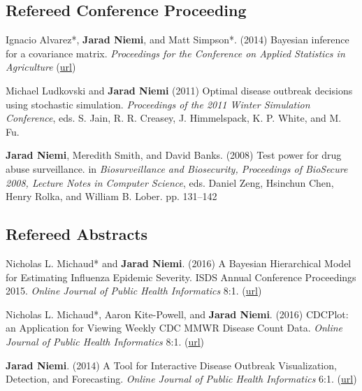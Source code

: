 \documentclass[overlapped,line]{res}
\newcommand{\sinceappt}{}
\begin{document}
\begin{resume}
\sinceappt

\subsection{\bf Refereed Conference Proceeding} \vspace{-0.2in}

Ignacio Alvarez*, {\bf Jarad Niemi}, and Matt Simpson*. (2014) Bayesian inference for a covariance matrix. \emph{Proceedings for the Conference on Applied Statistics in Agriculture} (\href{http://newprairiepress.org/agstatconference/2014/proceedings/8/}{url})

Michael Ludkovski and {\bf Jarad Niemi} (2011) Optimal disease outbreak decisions using stochastic simulation. \emph{Proceedings of the 2011 Winter Simulation Conference}, eds. S. Jain, R. R. Creasey, J. Himmelspack, K. P. White, and M. Fu.

\sinceappt

{\bf Jarad Niemi}, Meredith Smith, and David Banks. (2008) Test power for drug abuse surveillance. in \emph{Biosurveillance and Biosecurity, Proceedings of BioSecure 2008, Lecture Notes in Computer Science},  eds. Daniel Zeng, Hsinchun Chen, Henry Rolka, and William B. Lober. pp. 131--142



\subsection{\bf Refereed Abstracts} \vspace{-0.2in}

Nicholas L. Michaud* and {\bf Jarad Niemi}. (2016) A Bayesian Hierarchical Model for Estimating Influenza Epidemic Severity. ISDS Annual Conference Proceedings 2015. \emph{Online Journal of Public Health Informatics} 8:1. (\href{http://ojphi.org/ojs/index.php/ojphi/article/view/6438}{url})

Nicholas L. Michaud*, Aaron Kite-Powell, and {\bf Jarad Niemi}. (2016) CDCPlot: an Application for Viewing Weekly CDC MMWR Disease Count Data. \emph{Online Journal of Public Health Informatics} 8:1. (\href{http://ojphi.org/ojs/index.php/ojphi/article/view/6556}{url})

{\bf Jarad Niemi}. (2014) A Tool for Interactive Disease Outbreak Visualization, Detection, and Forecasting. \emph{Online Journal of Public Health Informatics} 6:1. (\href{http://ojphi.org/article/view/5017}{url})


\end{resume}
\end{document}
